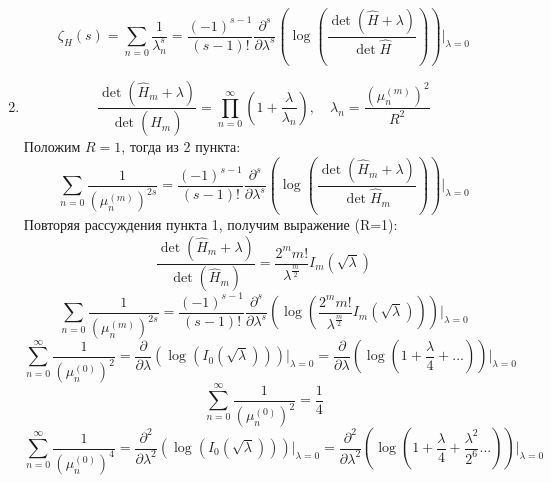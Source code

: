 \documentclass[12pt]{article}
\theoremstyle{definition}
\begin{document}
\begin{enumerate}
\begin{multline}
    \end{multline}
    \begin{equation}
        \boxed{\zeta_H(s)=\sum\limits_{n=0}\frac{1}{\lambda_n^s}=\frac{(-1)^{s-1}}{(s-1)!}\frac{\partial^s}{\partial\lambda^s}\left(\log\left(\frac{\det(\hat{H}+\lambda)}{\det{\hat{H}}}\right)\right)\bigg|_{\lambda=0}}
    \end{equation}
    \item 
    \begin{equation}
        \frac{\det(\hat{H}_m+\lambda)}{\det(\hat{H}_m)}=\prod\limits_{n=0}^\infty\left(1+\frac{\lambda}{\lambda_n}\right),\quad\lambda_n=\frac{(\mu^{(m)}_n)^2}{R^2}
    \end{equation}
    Положим $R=1$, тогда из 2 пункта:
    \begin{equation}
        \sum\limits_{n=0}\frac{1}{(\mu^{(m)}_n)^{2s}}=\frac{(-1)^{s-1}}{(s-1)!}\frac{\partial^s}{\partial\lambda^s}\left(\log\left(\frac{\det(\hat{H}_m+\lambda)}{\det{\hat{H}_m}}\right)\right)\bigg|_{\lambda=0}
    \end{equation}
    Повторяя рассуждения пункта 1, получим выражение (R=1):
    \begin{equation}
        \frac{\det(\hat{H}_m+\lambda)}{\det(\hat{H}_m)}=\frac{2^mm!}{\lambda^\frac{m}{2}}I_m(\sqrt{\lambda})
    \end{equation}
    \begin{equation}
        \sum\limits_{n=0}\frac{1}{(\mu^{(m)}_n)^{2s}}=\frac{(-1)^{s-1}}{(s-1)!}\frac{\partial^s}{\partial\lambda^s}\left(\log\left(\frac{2^mm!}{\lambda^\frac{m}{2}}I_m(\sqrt{\lambda})\right)\right)\bigg|_{\lambda=0}
    \end{equation}
    \begin{equation}
        \sum_{n=0}^{\infty}\frac{1}{\left(\mu_{n}^{(0)}\right)^{2}}=\frac{\partial}{\partial\lambda}\left(\log\left(I_0(\sqrt{\lambda})\right)\right)\bigg|_{\lambda=0}=\frac{\partial}{\partial\lambda}\left(\log\left(1+\frac{\lambda}{4}+...\right)\right)\bigg|_{\lambda=0}
    \end{equation}
    \begin{equation}
        \boxed{\sum_{n=0}^{\infty}\frac{1}{\left(\mu_{n}^{(0)}\right)^2}=\frac{1}{4}}
    \end{equation}
    \begin{equation}
        \sum_{n=0}^{\infty}\frac{1}{\left(\mu_{n}^{(0)}\right)^4}=\frac{\partial^2}{\partial\lambda^2}\left(\log\left(I_0(\sqrt{\lambda})\right)\right)\bigg|_{\lambda=0}=\frac{\partial^2}{\partial\lambda^2}\left(\log\left(1+\frac{\lambda}{4}+\frac{\lambda^2}{2^6}...\right)\right)\bigg|_{\lambda=0}

\end{equation}
\end{enumerate}
\end{document}

